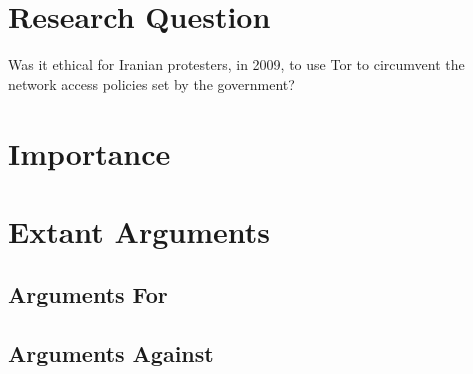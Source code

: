 \documentclass[11pt]{article}
\begin{document}
\begin{multicols}{2}




\section{Research Question} Was it ethical for Iranian protesters, in 2009, to
use Tor to circumvent the network access policies set by the government?


\section{Importance}

\section{Extant Arguments} 



\subsection{Arguments For}



\subsection{Arguments Against}





\end{multicols}
\end{document}
